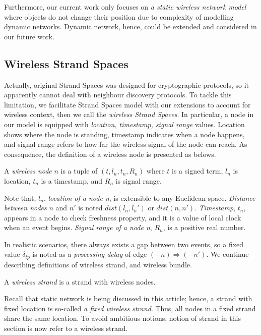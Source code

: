 Furthermore, our current work only focuses on \textit{a static wireless network model} where objects do not change their position due to complexity of modelling dynamic networks. Dynamic network, hence, could be extended and considered in our future work. 

\subsection{Wireless Strand Spaces}

Actually, original Strand Spaces was designed for cryptographic protocols, so it apparently cannot deal with neighbour discovery protocols. To tackle this limitation, we facilitate Strand Spaces model with our extensions to account for wireless context, then we call the \textit{wireless Strand Spaces}. In particular, a node in our model is equipped with \textit{location, timestamp, signal range} values. Location shows where the node is standing, timestamp indicates when a node happens, and signal range refers to how far the wireless signal of the node can reach. As consequence, the definition of a wireless node is presented as belows.

\begin{Definition} A \emph{wireless node} $n$ is a tuple of $(t, l_n, t_n, R_n)$ where $t$ is a signed term, $l_n$ is location, $t_n$ is a timestamp, and $R_n$ is signal range.\end{Definition}

Note that, $l_n$, \textit{location of a node n}, is extensible to any Euclidean space. \textit{Distance between nodes} $n$ and $n'$ is noted $dist(l_n,l_n')$ or $dist(n,n')$. \textit{Timestamp}, $t_n$, appears in a node to check freshness property, and it is a value of local clock when an event begins. \textit{Signal range of a node n}, $R_n$, is a positive real number. 

In realistic scenarios, there always exists a gap between two events, so a fixed value $\delta_{tp}$ is noted as a \textit{processing delay} of edge $ (+n) \Rightarrow (-n')$. We continue describing definitions of wireless strand, and wireless bundle. 

\begin{Definition} A \emph{wireless strand} is a strand with wireless nodes.
\end{Definition}

Recall that static network is being discussed in this article; hence, a strand with fixed location is so-called \textit{a fixed wireless strand}. Thus, all nodes in a fixed strand share the same location. To avoid ambitious notions, notion of strand in this section is now refer to a wireless strand. 

